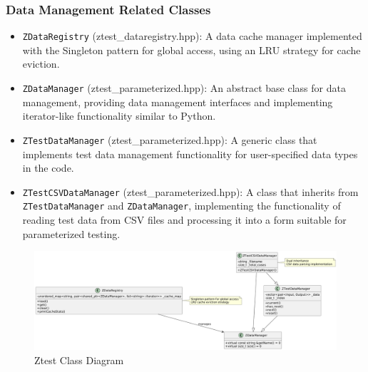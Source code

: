 \documentclass{article}
\begin{document}
\subsubsection{Data Management Related Classes}
\begin{itemize}
    \item \texttt{ZDataRegistry} (ztest\_dataregistry.hpp): A data cache manager implemented with the Singleton pattern for global access, using an LRU strategy for cache eviction.
    \item \texttt{ZDataManager} (ztest\_parameterized.hpp): An abstract base class for data management, providing data management interfaces and implementing iterator-like functionality similar to Python.
    \item \texttt{ZTestDataManager} (ztest\_parameterized.hpp): A generic class that implements test data management functionality for user-specified data types in the code.
    \item \texttt{ZTestCSVDataManager} (ztest\_parameterized.hpp): A class that inherits from \texttt{ZTestDataManager} and \texttt{ZDataManager}, implementing the functionality of reading test data from CSV files and processing it into a form suitable for parameterized testing.
\end{itemize}
\begin{figure}[H]
    \centering
    \includegraphics[width = \textwidth]{img/c4.png} %
    \caption{Ztest Class Diagram}
    \label{fig:ztest class }
\end{figure}
\end{document}
